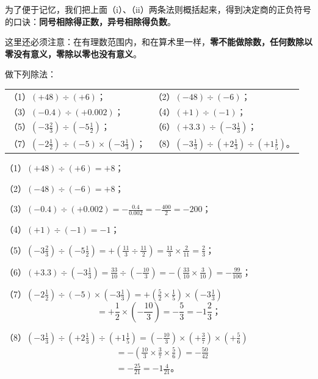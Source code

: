 为了便于记忆，我们把上面（i）、（ii）两条法则概括起来，得到决定商的正负符号的口诀：\textbf{同号相除得正数，异号相除得负数}。

这里还必须注意：在有理数范围内，和在算术里一样，\textbf{零不能做除数，任何数除以零没有意义，零除以零也没有意义}。

 做下列除法：
\par\smallskip
\begin{tabular}{@{}ll@{}}
（1）\((+48) \div (+6)\)； & （2）\((-48) \div (-6)\)； \\[4pt]
（3）\((-0.4) \div (+0.002)\)； & （4）\((+1) \div (-1)\)； \\[4pt]
（5）\(\left(-3\frac{2}{3}\right) \div \left(-5\frac{1}{2}\right)\)； & （6）\((+3.3) \div \left(-3\frac{1}{3}\right)\)； \\[4pt]
（7）\(\left(-2\frac{1}{2}\right) \div (-5) \times \left(-3\frac{1}{3}\right)\)；\quad & （8）\(\left(-3\frac{1}{3}\right) \div \left(+2\frac{1}{3}\right) \div \left(+1\frac{1}{5}\right)\)。
\end{tabular}

 （1）\((+48) \div (+6) = +8\)；

（2）\((-48) \div (-6) = +8\)；

（3）\((-0.4) \div (+0.002) = -\frac{0.4}{0.002} = -\frac{400}{2} = -200\)；

（4）\((+1) \div (-1) = -1\)；

（5）\(\left(-3\frac{2}{3}\right) \div \left(-5\frac{1}{2}\right) = +\left(\frac{11}{3} \div \frac{11}{2}\right) = \frac{11}{3} \times \frac{2}{11} = \frac{2}{3}\)；

（6）\((+3.3) \div \left(-3\frac{1}{3}\right) = \frac{33}{10} \div \left(-\frac{10}{3}\right) = -\left(\frac{33}{10} \times \frac{3}{10}\right) = -\frac{99}{100}\)；

（7）\(\left(-2\frac{1}{2}\right) \div (-5) \times \left(-3\frac{1}{3}\right) = +\left(\frac{5}{2} \times \frac{1}{5}\right) \times \left(-3\frac{1}{3}\right)\)
\[
= +\frac{1}{2} \times \left(-\frac{10}{3}\right) = -\frac{5}{3} = -1\frac{2}{3}；
\]

（8）\(\left(-3\frac{1}{3}\right) \div \left(+2\frac{1}{3}\right) \div \left(+1\frac{1}{5}\right) = \left(-\frac{10}{3}\right) \times \left(+\frac{3}{7}\right) \times \left(+\frac{5}{6}\right)\)
\begin{align*}
&= -\left(\frac{10}{3} \times \frac{3}{7} \times \frac{5}{6}\right) = -\frac{50}{42} \\
&= -\frac{25}{21} = -1\frac{4}{21}。
\end{align*}


